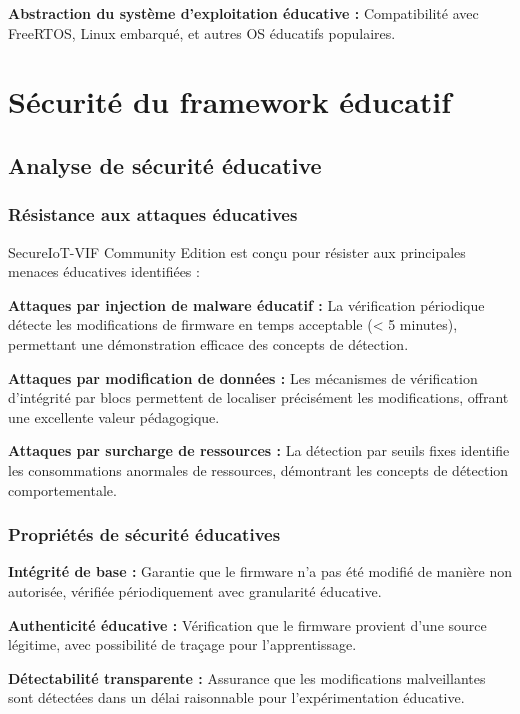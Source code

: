 \begin{algorithm}
\textbf{Abstraction du système d'exploitation éducative :} Compatibilité avec FreeRTOS, Linux embarqué, et autres OS éducatifs populaires.

\section{Sécurité du framework éducatif}

\subsection{Analyse de sécurité éducative}

\subsubsection{Résistance aux attaques éducatives}

SecureIoT-VIF Community Edition est conçu pour résister aux principales menaces éducatives identifiées :

\textbf{Attaques par injection de malware éducatif :} La vérification périodique détecte les modifications de firmware en temps acceptable (< 5 minutes), permettant une démonstration efficace des concepts de détection.

\textbf{Attaques par modification de données :} Les mécanismes de vérification d'intégrité par blocs permettent de localiser précisément les modifications, offrant une excellente valeur pédagogique.

\textbf{Attaques par surcharge de ressources :} La détection par seuils fixes identifie les consommations anormales de ressources, démontrant les concepts de détection comportementale.

\subsubsection{Propriétés de sécurité éducatives}

\textbf{Intégrité de base :} Garantie que le firmware n'a pas été modifié de manière non autorisée, vérifiée périodiquement avec granularité éducative.

\textbf{Authenticité éducative :} Vérification que le firmware provient d'une source légitime, avec possibilité de traçage pour l'apprentissage.

\textbf{Détectabilité transparente :} Assurance que les modifications malveillantes sont détectées dans un délai raisonnable pour l'expérimentation éducative.


\end{algorithm}
